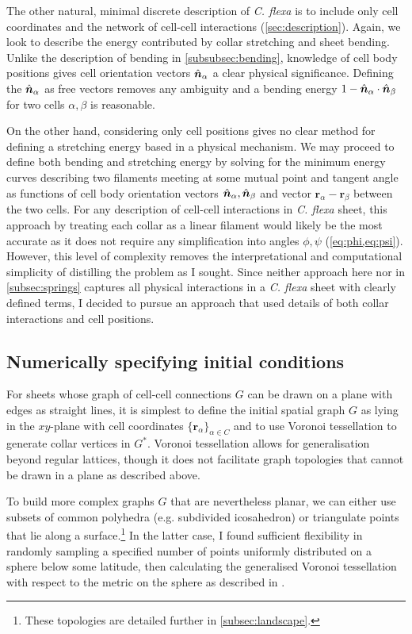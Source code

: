 The other natural, minimal discrete description of \textit{C. flexa} is to include only cell coordinates and the network of cell-cell interactions (\cref{sec:description}).
Again, we look to describe the energy contributed by collar stretching and sheet bending.
Unlike the description of bending in \cref{subsubsec:bending}, knowledge of cell body positions gives cell orientation vectors $\hat{\bm{n}}_\alpha$ a clear physical significance.
Defining the $\hat{\bm{n}}_\alpha$ as free vectors removes any ambiguity and a bending energy $1 - \hat{\bm{n}}_\alpha \cdot \hat{\bm{n}}_\beta$ for two cells $\alpha, \beta$ is reasonable.

On the other hand, considering only cell positions gives no clear method for defining a stretching energy based in a physical mechanism.
We may proceed to define both bending and stretching energy by solving for the minimum energy curves describing two filaments meeting at some mutual point and tangent angle as functions of cell body orientation vectors $\hat{\bm{n}}_\alpha, \hat{\bm{n}}_\beta$ and vector $\bm{r}_\alpha - \bm{r}_\beta$ between the two cells.
For any description of cell-cell interactions in \textit{C. flexa} sheet, this approach by treating each collar as a linear filament would likely be the most accurate as it does not require any simplification into angles $\phi, \psi$ (\cref{eq:phi,eq:psi}).
However, this level of complexity removes the interpretational and computational simplicity of distilling the problem as I sought. 
Since neither approach here nor in \cref{subsec:springs} captures all physical interactions in a \textit{C. flexa} sheet with clearly defined terms, I decided to pursue an approach that used details of both collar interactions and cell positions.

\subsection{Numerically specifying initial conditions} \label{subsec:init}

For sheets whose graph of cell-cell connections $G$ can be drawn on a plane with edges as straight lines, it is simplest to define the initial spatial graph $G$ as lying in the $xy$-plane with cell coordinates $\{\bm{r}_\alpha\}_{\alpha\in C}$ and to use Voronoi tessellation to generate collar vertices in $G^*$. 
Voronoi tessellation allows for generalisation beyond regular lattices, though it does not facilitate graph topologies that cannot be drawn in a plane as described above. 

To build more complex graphs $G$ that are nevertheless planar, we can either use subsets of common polyhedra (e.g. subdivided icosahedron) or triangulate points that lie along a surface.\footnote{These topologies are detailed further in \cref{subsec:landscape}.}
In the latter case, I found sufficient flexibility in randomly sampling a specified number of points uniformly distributed on a sphere below some latitude, then calculating the generalised Voronoi tessellation with respect to the metric on the sphere as described in \citet{caroli2010}.

